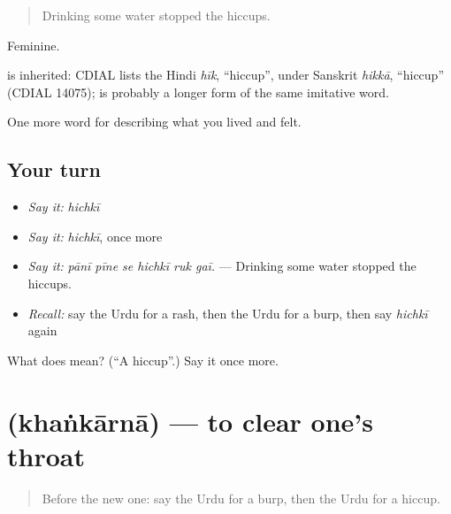 \begin{quote}
Drinking some water stopped the hiccups.
\end{quote}

Feminine.

\begin{cousinweb}
is inherited: CDIAL lists the Hindi \emph{hīk}, \textquotedblleft{}hiccup\textquotedblright{}, under Sanskrit \emph{hikkā}, \textquotedblleft{}hiccup\textquotedblright{} (CDIAL 14075); \textbf{} is probably a longer form of the same imitative word.
\end{cousinweb}

\begin{grammarlens}[title={What you've built}]
One more word for describing what you lived and felt.
\end{grammarlens}

\subsection*{Your turn}
\begin{itemize}
\raggedright
  \item \emph{Say it:} \emph{hichkī}
  \item \emph{Say it:} \emph{hichkī}, once more
  \item \emph{Say it:} \emph{pānī pīne se hichkī ruk gaī.} — Drinking some water stopped the hiccups.
  \item \emph{Recall:} say the Urdu for a rash, then the Urdu for a burp, then say \emph{hichkī} again
\end{itemize}

\begin{tcolorbox}[breakable,colback=teal!4,colframe=teal!35!black,title={Before you move on}]
What does  mean? (\textquotedblleft{}A hiccup\textquotedblright{}.) Say it once more.
\end{tcolorbox}
\section[\texorpdfstring{\ur{کھنکارنا} (khaṅkārnā)}{کھنکارنا (khaṅkārnā)}]{ (khaṅkārnā) — to clear one's throat}

\label{lesson:UR-C469-khankarna}



\begin{quote}
Before the new one: say the Urdu for a burp, then the Urdu for a hiccup.
\end{quote}


